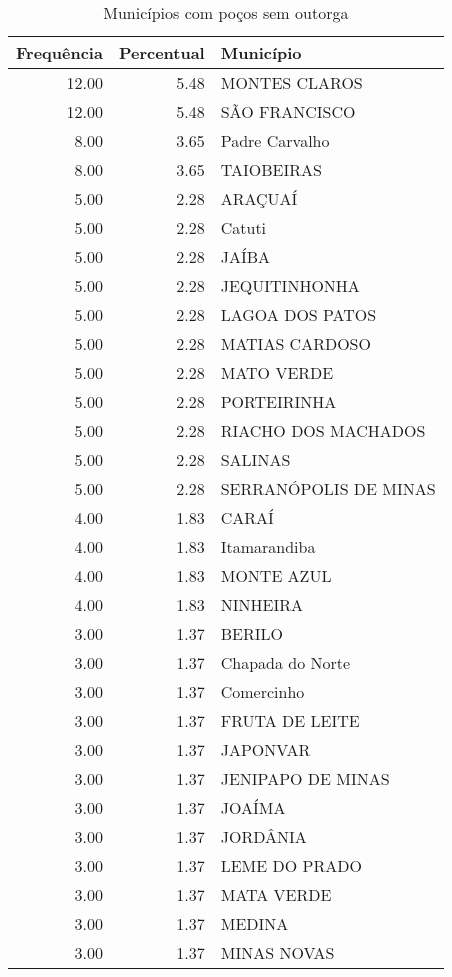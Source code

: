 \documentclass[a4paper, 12pt, openright, oneside, english, brazil, article]{abntex2}
\begin{document}
	
	\begin{scriptsize}
	\begin{longtable}{rrl}
		\caption{Municípios com poços sem outorga} \\ 
		\hline
		Frequência & Percentual & Município \\ 
		\hline
		12.00 & 5.48 & MONTES CLAROS \\ 
		12.00 & 5.48 & SÃO FRANCISCO \\ 
		8.00 & 3.65 & Padre Carvalho \\ 
		8.00 & 3.65 & TAIOBEIRAS \\ 
		5.00 & 2.28 & ARAÇUAÍ \\ 
		5.00 & 2.28 & Catuti \\ 
		5.00 & 2.28 & JAÍBA \\ 
		5.00 & 2.28 & JEQUITINHONHA \\ 
		5.00 & 2.28 & LAGOA DOS PATOS \\ 
		5.00 & 2.28 & MATIAS CARDOSO \\ 
		5.00 & 2.28 & MATO VERDE \\ 
		5.00 & 2.28 & PORTEIRINHA \\ 
		5.00 & 2.28 & RIACHO DOS MACHADOS \\ 
		5.00 & 2.28 & SALINAS \\ 
		5.00 & 2.28 & SERRANÓPOLIS DE MINAS \\ 
		4.00 & 1.83 & CARAÍ \\ 
		4.00 & 1.83 & Itamarandiba \\ 
		4.00 & 1.83 & MONTE AZUL \\ 
		4.00 & 1.83 & NINHEIRA \\ 
		3.00 & 1.37 & BERILO \\ 
		3.00 & 1.37 & Chapada do Norte \\ 
		3.00 & 1.37 & Comercinho \\ 
		3.00 & 1.37 & FRUTA DE LEITE \\ 
		3.00 & 1.37 & JAPONVAR \\ 
		3.00 & 1.37 & JENIPAPO DE MINAS \\ 
		3.00 & 1.37 & JOAÍMA \\ 
		3.00 & 1.37 & JORDÂNIA \\ 
		3.00 & 1.37 & LEME DO PRADO \\ 
		3.00 & 1.37 & MATA VERDE \\ 
		3.00 & 1.37 & MEDINA \\ 
		3.00 & 1.37 & MINAS NOVAS \\ 

\end{longtable}
\end{scriptsize}
\end{document}
